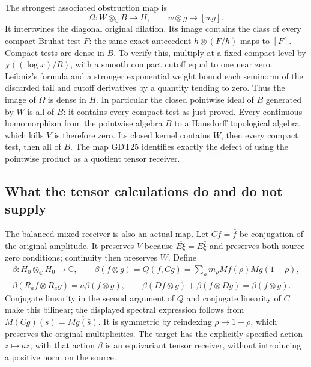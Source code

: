 The strongest associated obstruction map is
\begin{equation}\tag{GDT25}
 \Omega:W\otimes_{\mathbb C}B\longrightarrow H,\qquad
               w\otimes g\longmapsto[wg].
\end{equation}
It intertwines the diagonal original dilation.
Its image contains the class of every compact
Bruhat test $F$: the same exact antecedent
$h\otimes(F/h)$ maps to $[F]$.
Compact tests are dense in $B$. To verify this,
multiply at a fixed compact level by
$\chi((\log x)/R)$, with a smooth compact cutoff
equal to one near zero. Leibniz's formula and
a stronger exponential weight bound each
seminorm of the discarded tail and cutoff
derivatives by a quantity tending to zero.
Thus the image of $\Omega$ is dense in $H$.
In particular the closed pointwise ideal of
$B$ generated by $W$ is all of $B$: it contains
every compact test as just proved.
Every continuous homomorphism from the
pointwise algebra $B$ to a Hausdorff topological
algebra which kills $V$ is therefore zero.
Its closed kernel contains $W$, then every
compact test, then all of $B$.
The map GDT25 identifies exactly the defect
of using the pointwise product as a quotient
tensor receiver.

\subsection{What the tensor calculations do and do not supply}

The balanced mixed receiver is also an actual map.
Let $C f=\bar f$ be conjugation of the original
amplitude. It preserves $V$ because
$\overline{E\xi}=E\bar\xi$ and preserves both
source zero conditions; continuity then preserves
$W$. Define
\begin{equation}\tag{GDT26}
 \begin{gathered}
 \beta:H_0\otimes_{\mathbb C}H_0\longrightarrow\mathbb C,
 \qquad\beta(f\otimes g)=Q(f,Cg)
       =\sum_\rho m_\rho Mf(\rho)Mg(1-\rho),\\
 \beta(R_af\otimes R_ag)=a\beta(f\otimes g),\qquad
 \beta(Df\otimes g)+\beta(f\otimes Dg)=\beta(f\otimes g).
 \end{gathered}
\end{equation}
Conjugate linearity in the second argument of
$Q$ and conjugate linearity of $C$ make this
bilinear; the displayed spectral expression
follows from $M(Cg)(s)=\overline{Mg(\bar s)}$.
It is symmetric by reindexing $\rho\mapsto1-\rho$,
which preserves the original multiplicities.
The target has the explicitly specified action
$z\mapsto az$; with that action $\beta$ is an
equivariant tensor receiver, without introducing
a positive norm on the source.

